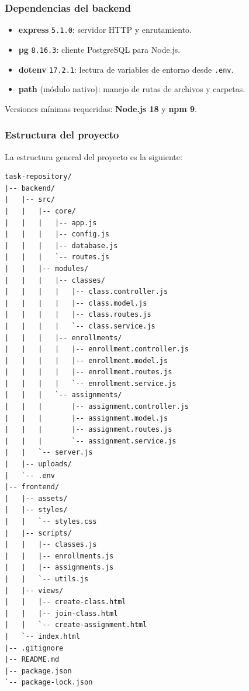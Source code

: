 \documentclass[12pt,a4paper]{article}
\begin{document}
\subsubsection*{Dependencias del backend}

\begin{itemize}
    \item \textbf{express} \texttt{5.1.0}: servidor HTTP y enrutamiento.
    \item \textbf{pg} \texttt{8.16.3}: cliente PostgreSQL para Node.js.
    \item \textbf{dotenv} \texttt{17.2.1}: lectura de variables de entorno desde \texttt{.env}.
    \item \textbf{path} (módulo nativo): manejo de rutas de archivos y carpetas.
\end{itemize}

Versiones mínimas requeridas: \textbf{Node.js 18} y \textbf{npm 9}.

\subsubsection*{Estructura del proyecto}

La estructura general del proyecto es la siguiente:

\begin{verbatim}
task-repository/
|-- backend/
|   |-- src/
|   |   |-- core/
|   |   |   |-- app.js
|   |   |   |-- config.js
|   |   |   |-- database.js
|   |   |   `-- routes.js
|   |   |-- modules/
|   |   |   |-- classes/
|   |   |   |   |-- class.controller.js
|   |   |   |   |-- class.model.js
|   |   |   |   |-- class.routes.js
|   |   |   |   `-- class.service.js
|   |   |   |-- enrollments/
|   |   |   |   |-- enrollment.controller.js
|   |   |   |   |-- enrollment.model.js
|   |   |   |   |-- enrollment.routes.js
|   |   |   |   `-- enrollment.service.js
|   |   |   `-- assignments/
|   |   |       |-- assignment.controller.js
|   |   |       |-- assignment.model.js
|   |   |       |-- assignment.routes.js
|   |   |       `-- assignment.service.js
|   |   `-- server.js
|   |-- uploads/
|   `-- .env
|-- frontend/
|   |-- assets/
|   |-- styles/
|   |   `-- styles.css
|   |-- scripts/
|   |   |-- classes.js
|   |   |-- enrollments.js
|   |   |-- assignments.js
|   |   `-- utils.js
|   |-- views/
|   |   |-- create-class.html
|   |   |-- join-class.html
|   |   `-- create-assignment.html
|   `-- index.html
|-- .gitignore
|-- README.md
|-- package.json
`-- package-lock.json
\end{verbatim}
\end{document}
